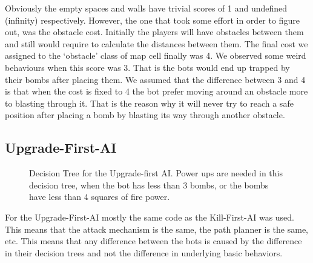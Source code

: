 Obviously the empty spaces and walls have trivial scores of 1 and undefined (infinity) respectively. However, the one that took some effort in order to figure out, was the obstacle cost.
Initially the players will have obstacles between them and still would require to calculate the distances between them. The final cost we assigned to the `obstacle' class of map cell finally was 4. We observed some weird behaviours when this score was 3. That is the bots would end up trapped by their bombs after placing them. We assumed that the difference between 3 and 4 is that when the cost is fixed to 4 the bot prefer moving around an obstacle more to blasting through it. That is the reason why it will never try to reach a safe position after placing a bomb by blasting its way through another obstacle.

\subsection{Upgrade-First-AI}
\begin{figure}
\centering
{}
\caption{Decision Tree for the Upgrade-first AI. Power ups are needed in this
decision tree, when the bot has less than 3 bombs, or the bombs have less than 4
squares of fire power.}
\label{fig:treeUpgradeFirst}
\end{figure}
For the Upgrade-First-AI mostly the same code as the Kill-First-AI was used.
This means that the attack mechanism is the same, the path planner is the same,
etc. This means that any difference between the bots is caused by the difference
in their decision trees and not the difference in underlying basic behaviors.

